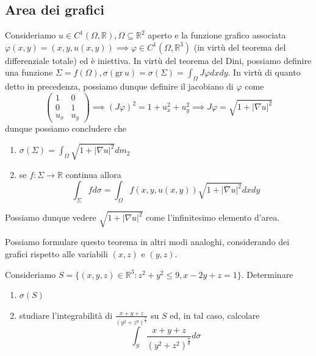 \subsection{Area dei grafici}
Consideriamo $u \in C^1(\Omega, \mathbb{R}), \Omega \subseteq \mathbb{R}^2$ aperto e la funzione grafico associata $\varphi(x, y)=(x, y, u(x,y)) \implies \varphi \in C^1(\Omega, \mathbb{R}^3)$ (in virtù del teorema del differenziale totale) ed è iniettiva.
In virtù del teorema del Dini, possiamo definire una funzione $\Sigma=f(\Omega), \sigma(\text{gr} \, u) = \sigma(\Sigma) = \int_\Omega J\varphi dxdy$. In virtù di quanto detto in precedenza, possiamo dunque definire il jacobiano di $\varphi$ come
$$
\begin{pmatrix}
1 & 0 \\
0 & 1 \\
u_x & u_y
\end{pmatrix} \implies (J\varphi)^2 = 1 + u_x^2 + u_y^2 \implies J\varphi = \sqrt{1 + |\nabla u|^2}
$$
dunque possiamo concludere che
%
\begin{enumerate}[label=\protect\circled{\arabic*}]
	\item $\sigma(\Sigma) = \int_\Omega \sqrt{1 + |\nabla u|^2} dm_2$
	\item se $f: \Sigma \to \mathbb{R}$ continua allora
	$$
		\int_\Sigma f d\sigma = \int_\Omega f(x, y, u(x, y)) \sqrt{1 + |\nabla u|^2} dxdy
	$$
\end{enumerate}
%
\begin{remark}
	Possiamo dunque vedere $\sqrt{1 + |\nabla u|^2}$ come l'infinitesimo elemento d'area.
\end{remark}
%
\begin{remark}
	Possiamo formulare questo teorema in altri modi analoghi, considerando dei grafici rispetto alle variabili $(x, z)$ e $(y, z)$.
\end{remark}
%
\vspace{0.5cm}
\begin{example}
	Consideriamo $S=\{(x, y, z) \in \mathbb{R}^3: z^2 + y^2 \leq 9, x - 2y + z = 1 \}$. Determinare
	\begin{enumerate}[label=\protect\circled{\arabic*}]
		\item $\sigma(S)$
		\item studiare l'integrabilità di $\frac{x+y+z}{(y^2 + z^9)^{\frac{7}{8}}}$ su $S$ ed, in tal caso, calcolare
		$$
			\int_S \frac{x+y+z}{(y^2 + z^2)^{\frac{7}{8}}} d\sigma
		$$
	\end{enumerate}
\end{example}
